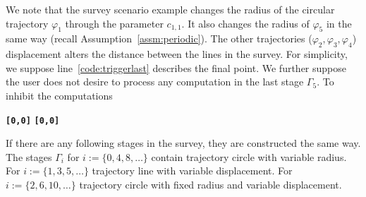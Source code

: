 \documentclass[letterpaper,10pt,conference]{ieeeconf}
\theoremstyle{definition}
\begin{document}
We note that the survey scenario example changes the radius of the circular trajectory $\varphi_1$ through the parameter $c_{1,1}$. It also changes the radius of $\varphi_5$ in the same way (recall Assumption~\ref{assm:periodic}). The other trajectories ($\varphi_2,\varphi_3,\varphi_4$) displacement alters the distance between the lines in the survey. For simplicity, we suppose line~\ref{code:triggerlast} describes the final point. We further suppose the user does not desire to process any computation in the last stage $\Gamma_5$. To inhibit the computations
\begin{algorithmic}[1]
  \State\textbf{\texttt{[0,0]}}
  \State\textbf{\texttt{[0,0]}}
\end{algorithmic}

If there are any following stages in the survey, they are constructed the same way. The stages $\Gamma_i$ for $i:=\{0,4,8,\dots\}$ contain trajectory circle with variable radius. For $i:=\{1,3,5,\dots\}$ trajectory line with variable displacement. For $i:=\{2,6,10,\dots\}$ trajectory circle with fixed radius and variable displacement.





\end{document}
